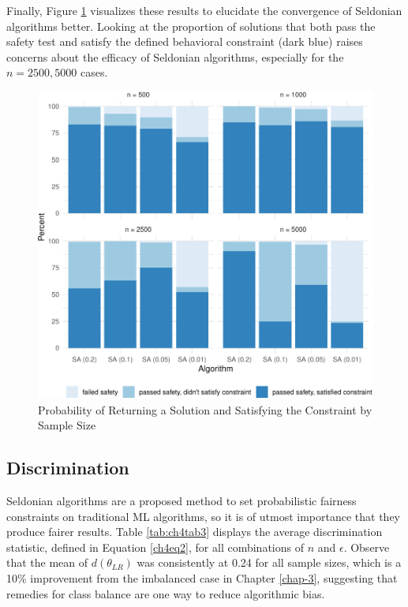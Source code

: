 \documentclass[12pt, twoside]{amherstthesis}
\begin{document}
Finally, Figure \ref{fig:ch4fig1} visualizes these results to elucidate the convergence of Seldonian algorithms better. Looking at the proportion of solutions that both pass the safety test and satisfy the defined behavioral constraint (dark blue) raises concerns about the efficacy of Seldonian algorithms, especially for the \(n = 2500, 5000\) cases.
\begin{figure}

{\centering \includegraphics{Dasha-Asienga_StatThesis_files/figure-latex/ch4fig1-1} 

}

\caption{Probability of Returning a Solution and Satisfying the Constraint by Sample Size}\label{fig:ch4fig1}
\end{figure}
\hypertarget{discrimination}{%
\subsection{Discrimination}\label{discrimination}}

Seldonian algorithms are a proposed method to set probabilistic fairness constraints on traditional ML algorithms, so it is of utmost importance that they produce fairer results. Table \ref{tab:ch4tab3} displays the average discrimination statistic, defined in Equation \ref{ch4eq2}, for all combinations of \(n\) and \(\epsilon\). Observe that the mean of \(d(\theta_{LR})\) was consistently at 0.24 for all sample sizes, which is a 10\% improvement from the imbalanced case in Chapter \ref{chap-3}, suggesting that remedies for class balance are one way to reduce algorithmic bias.
\end{document}
